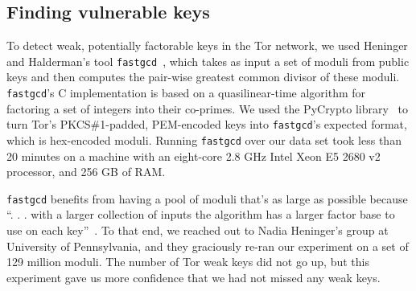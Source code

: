 \subsection{Finding vulnerable keys}
\label{sec:vulnerable-keys}
To detect weak, potentially factorable keys in the Tor network, we used Heninger
and Halderman's tool \texttt{fastgcd}~\cite{fastgcd}, which takes as input a set of
moduli from public keys and then computes the pair-wise greatest common divisor
of these moduli.  \texttt{fastgcd}'s C implementation is based on a quasilinear-time
algorithm for factoring a set of integers into their co-primes.  We used the
PyCrypto library~\cite{pycrypto} to turn Tor's PKCS\#1-padded, PEM-encoded keys
into \texttt{fastgcd}'s expected format, which is hex-encoded moduli.  Running 
\texttt{fastgcd} over our data set took less than 20 minutes on 
a machine with an eight-core 2.8 GHz Intel Xeon E5 2680 v2 processor, 
and 256 GB of RAM.

\texttt{fastgcd} benefits from having a pool of moduli that's as large as possible because 
``. . . with a larger collection of inputs the algorithm has a larger 
factor base to use on each key''~\cite{Heninger2012a}.  
To that end, we reached out to Nadia Heninger's group at University of Pennsylvania, 
and they graciously re-ran our experiment on a set of 129 million 
moduli. The number of Tor weak keys did not go up, but 
this experiment gave us more confidence that we had not missed any weak keys.
